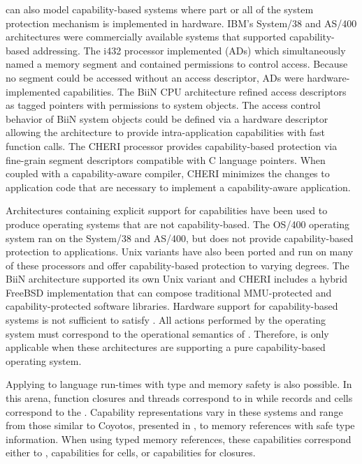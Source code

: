 \TMmodelName{} can also model capability-based systems where part or all of the system protection mechanism is implemented in hardware.
IBM's System/38 and AS/400 architectures were commercially available systems that supported capability-based addressing. \cite{IBM:System38:FunctionalRefMan}
The i432 processor implemented  (ADs) which simultaneously named a memory segment and contained permissions to control access. \cite{iax432:refman}
Because no segment could be accessed without an access descriptor, ADs were hardware-implemented capabilities.
The BiiN CPU architecture refined access descriptors as tagged pointers with permissions to system objects. \cite{BiiN:refman}
The access control behavior of BiiN system objects could be defined via a hardware descriptor allowing the architecture to provide intra-application capabilities with fast function calls.
The CHERI processor provides capability-based protection via fine-grain segment descriptors compatible with C language pointers. \cite{watson2015cheri}
When coupled with a capability-aware compiler, CHERI minimizes the changes to application code that are necessary to implement a capability-aware application.

Architectures containing explicit support for capabilities have been used to produce operating systems that are not capability-based.
The OS/400 operating system ran on the System/38 and AS/400, but does not provide capability-based protection to applications.\cite{soltis1996inside}
Unix variants have also been ported and run on many of these processors and offer capability-based protection to varying degrees.
The BiiN architecture supported its own Unix variant and CHERI includes a hybrid FreeBSD implementation that can compose traditional MMU-protected and capability-protected software libraries.
Hardware support for capability-based systems is not sufficient to satisfy \TMmodelName{}.
All actions performed by the operating system must correspond to the operational semantics of \TMmodelName{}.
Therefore, \TMmodelName{} is only applicable when these architectures are supporting a pure capability-based operating system.

Applying \TMmodelName{} to language run-times with type and memory safety is also possible.
In this arena, function closures and threads correspond to \TMactive{} \TMobjs{} in \TMmodelName{} while records and cells correspond to the \TMpassive{} \TMobjs{}.
Capability representations vary in these systems and range from those similar to Coyotos, presented in , to memory references with safe type information.
When using typed memory references, these capabilities correspond either to {\NMrd{}, \NMwr{}} capabilities for cells, or \NMtx{} capabilities for closures.

